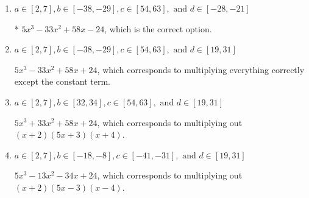 \documentclass{extbook}[14pt]
\begin{document}
\begin{enumerate}
{\begin{enumerate}[label=\Alph*.]
$5x^{3} -7 x^{2} -46 x -24$, which corresponds to multiplying out $(x + 2)(5x + 3)(x -4)$.
\item \( a \in [2, 7], b \in [-38, -29], c \in [54, 63], \text{ and } d \in [-28, -21] \)

* $5x^{3} -33 x^{2} +58 x -24$, which is the correct option.
\item \( a \in [2, 7], b \in [-38, -29], c \in [54, 63], \text{ and } d \in [19, 31] \)

$5x^{3} -33 x^{2} +58 x + 24$, which corresponds to multiplying everything correctly except the constant term.
\item \( a \in [2, 7], b \in [32, 34], c \in [54, 63], \text{ and } d \in [19, 31] \)

$5x^{3} +33 x^{2} +58 x + 24$, which corresponds to multiplying out $(x + 2)(5x + 3)(x + 4)$.
\item \( a \in [2, 7], b \in [-18, -8], c \in [-41, -31], \text{ and } d \in [19, 31] \)

$5x^{3} -13 x^{2} -34 x + 24$, which corresponds to multiplying out $(x + 2)(5x -3)(x -4)$.
\end{enumerate}

}
\end{enumerate}
\end{document}
